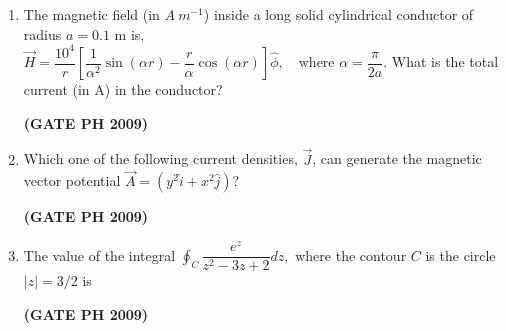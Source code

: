 \documentclass[14pt, a4paper]{extarticle}
\begin{document}
\begin{enumerate}[label=\textbf{Q. \arabic*}, start=21]

\item The magnetic field (in $A~m^{-1}$) inside a long solid cylindrical conductor of radius $a = 0.1$ m is,
$ \vec{H} = \dfrac{10^4}{r} \left[ \dfrac{1}{\alpha^2}\sin(\alpha r) - \dfrac{r}{\alpha}\cos(\alpha r) \right] \hat{\phi}, \quad \text{where } \alpha = \dfrac{\pi}{2a}. $
What is the total current (in A) in the conductor?
\begin{enumerate}
\end{enumerate}
\hfill \textbf{(GATE PH 2009)}

\item Which one of the following current densities, $\vec{J}$, can generate the magnetic vector potential $\vec{A} = (y^2\hat{i} + x^2\hat{j})$?
\begin{enumerate}
\end{enumerate}
\hfill \textbf{(GATE PH 2009)}

\item The value of the integral $\oint_C \dfrac{e^z}{z^2 - 3z + 2} dz,$
where the contour $C$ is the circle $|z| = 3/2$ is
\begin{enumerate}
\end{enumerate}
\hfill \textbf{(GATE PH 2009)}


\end{enumerate}
\end{document}
